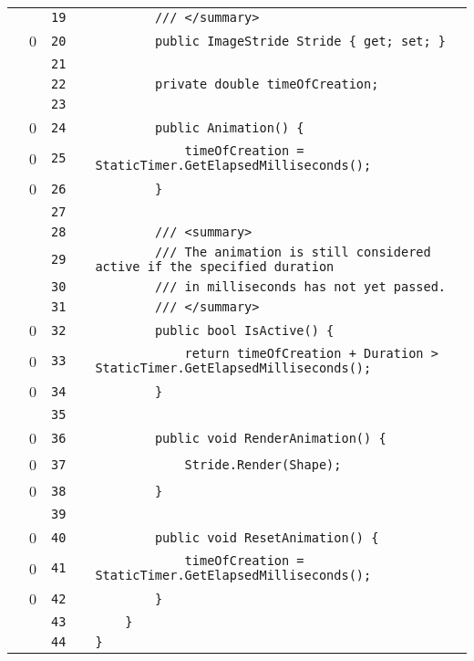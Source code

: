 \documentclass[a4paper,landscape,10pt]{article}
\begin{document}
\begin{longtable}[l]{lrrll}
\cellcolor{gray} &  & \verb~19~ & & \verb~        /// </summary>~\\
\cellcolor{red} & 0 & \verb~20~ & & \verb~        public ImageStride Stride { get; set; }~\\
\cellcolor{gray} &  & \verb~21~ & & \verb~~\\
\cellcolor{gray} &  & \verb~22~ & & \verb~        private double timeOfCreation;~\\
\cellcolor{gray} &  & \verb~23~ & & \verb~~\\
\cellcolor{red} & 0 & \verb~24~ & & \verb~        public Animation() {~\\
\cellcolor{red} & 0 & \verb~25~ & & \verb~            timeOfCreation = StaticTimer.GetElapsedMilliseconds();~\\
\cellcolor{red} & 0 & \verb~26~ & & \verb~        }~\\
\cellcolor{gray} &  & \verb~27~ & & \verb~~\\
\cellcolor{gray} &  & \verb~28~ & & \verb~        /// <summary>~\\
\cellcolor{gray} &  & \verb~29~ & & \verb~        /// The animation is still considered active if the specified duration~\\
\cellcolor{gray} &  & \verb~30~ & & \verb~        /// in milliseconds has not yet passed.~\\
\cellcolor{gray} &  & \verb~31~ & & \verb~        /// </summary>~\\
\cellcolor{red} & 0 & \verb~32~ & & \verb~        public bool IsActive() {~\\
\cellcolor{red} & 0 & \verb~33~ & & \verb~            return timeOfCreation + Duration > StaticTimer.GetElapsedMilliseconds();~\\
\cellcolor{red} & 0 & \verb~34~ & & \verb~        }~\\
\cellcolor{gray} &  & \verb~35~ & & \verb~~\\
\cellcolor{red} & 0 & \verb~36~ & & \verb~        public void RenderAnimation() {~\\
\cellcolor{red} & 0 & \verb~37~ & & \verb~            Stride.Render(Shape);~\\
\cellcolor{red} & 0 & \verb~38~ & & \verb~        }~\\
\cellcolor{gray} &  & \verb~39~ & & \verb~~\\
\cellcolor{red} & 0 & \verb~40~ & & \verb~        public void ResetAnimation() {~\\
\cellcolor{red} & 0 & \verb~41~ & & \verb~            timeOfCreation = StaticTimer.GetElapsedMilliseconds();~\\
\cellcolor{red} & 0 & \verb~42~ & & \verb~        }~\\
\cellcolor{gray} &  & \verb~43~ & & \verb~    }~\\
\cellcolor{gray} &  & \verb~44~ & & \verb~}~\\
\end{longtable}
\newpage
\end{document}
